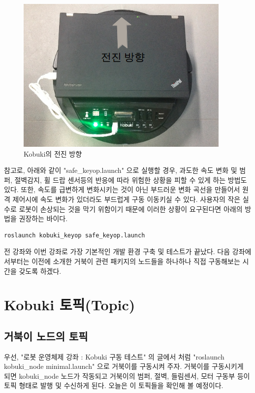 \begin{figure}[h]
\centering\includegraphics[width=0.7\columnwidth]{pictures/chapter10/kobuki_test.png}
\caption{Kobuki의 전진 방향}
\end{figure}

\vspace{\baselineskip}
\noindent
참고로, 아래와 같이 "safe\_keyop.launch" 으로 실행할 경우, 과도한 속도 변화 및 범퍼, 절벽감지, 휠 드랍 센서등의 반응에 따라 위험한 상황을 피할 수 있게 하는 방법도 있다. 또한, 속도를 급변하게 변화시키는 것이 아닌 부드러운 변화 곡선을 만들어서 원격 제어시에 속도 변화가 있더라도 부드럽게 구동 이동키실 수 있다. 사용자의 작은 실수로 로봇이 손상되는 것을 막기 위함이기 때문에 이러한 상황이 요구된다면 아래의 방법을 권장하는 바이다.

\begin{lstlisting}[language=ROS]
roslaunch kobuki_keyop safe_keyop.launch
\end{lstlisting}

전 강좌와 이번 강좌로 가장 기본적인 개발 환경 구축 및 테스트가 끝났다. 다음 강좌에서부터는 이전에 소개한 거북이 관련 패키지의 노드들을 하나하나 직접 구동해보는 시간을 갖도록 하겠다.

\section{Kobuki 토픽(Topic)}

\subsection{거북이 노드의 토픽}

우선, "로봇 운영체제 강좌 : Kobuki 구동 테스트" 의 글에서 처럼 "roslaunch kobuki\_node minimal.launch" 으로 거북이를 구동시켜 주자. 거북이를 구동시키게 되면 kobuki\_node 노드가 작동되고 거북이의 범퍼, 절벽, 들림센서, 모터 구동부 등이 토픽 형태로 발행 및 수신하게 된다.  오늘은 이 토픽들을 확인해 볼 예정이다.

